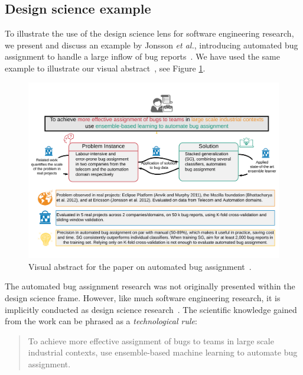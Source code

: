 \documentclass[graybox]{svmult}
\begin{document}
\subsection{Design science example}
\label{sec:examples}
To illustrate the use of the design science lens for software engineering research, we present and discuss an example by Jonsson \emph{et al.}, introducing automated bug assignment to handle a large inflow of bug reports~\cite{JonssonBug15}. We have used the same example to illustrate our visual abstract~\cite{StoreyESEM17}, see Figure \ref{fig:BugAssignment}.

\begin{figure}[t]
\begin{center}
\includegraphics[width=\columnwidth, trim={5mm 20mm 5mm 20mm },clip]{Figures/VATemplateJonsson.pdf}
\caption{Visual abstract for the paper on automated bug assignment~\cite{JonssonBug15}.}
\label{fig:BugAssignment}
\end{center}
\end{figure}

The automated bug assignment research was not originally presented within the design science frame. However, like much software engineering research, it is implicitly conducted as design science research~\cite{Engstrom19arxiv}. 
The scientific knowledge gained from the work can be phrased as a \emph{technological rule}:
\begin{quote}{To achieve more effective assignment of bugs to teams in large scale industrial contexts, use ensemble-based machine learning to automate bug assignment.~\cite{StoreyESEM17}}\end{quote}
\end{document}

